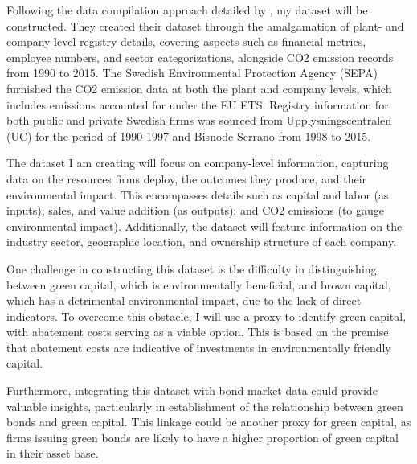 Following the data compilation approach detailed by \cite{martinsson2024effect}, my dataset will be constructed. They created their dataset through the amalgamation of plant- and company-level registry details, covering aspects such as financial metrics, employee numbers, and sector categorizations, alongside CO2 emission records from 1990 to 2015. The Swedish Environmental Protection Agency (SEPA) furnished the CO2 emission data at both the plant and company levels, which includes emissions accounted for under the EU ETS. Registry information for both public and private Swedish firms was sourced from Upplysningscentralen (UC) for the period of 1990-1997 and Bisnode Serrano from 1998 to 2015.

The dataset I am creating will focus on company-level information, capturing data on the resources firms deploy, the outcomes they produce, and their environmental impact. This encompasses details such as capital and labor (as inputs); sales, and value addition (as outputs); and CO2 emissions (to gauge environmental impact). Additionally, the dataset will feature information on the industry sector, geographic location, and ownership structure of each company.

One challenge in constructing this dataset is the difficulty in distinguishing between green capital, which is environmentally beneficial, and brown capital, which has a detrimental environmental impact, due to the lack of direct indicators. To overcome this obstacle, I will use a proxy to identify green capital, with abatement costs serving as a viable option. This is based on the premise that abatement costs are indicative of investments in environmentally friendly capital.

Furthermore, integrating this dataset with bond market data could provide valuable insights, particularly in establishment of the relationship between green bonds and green capital. This linkage could be another proxy for green capital, as firms issuing green bonds are likely to have a higher proportion of green capital in their asset base. 